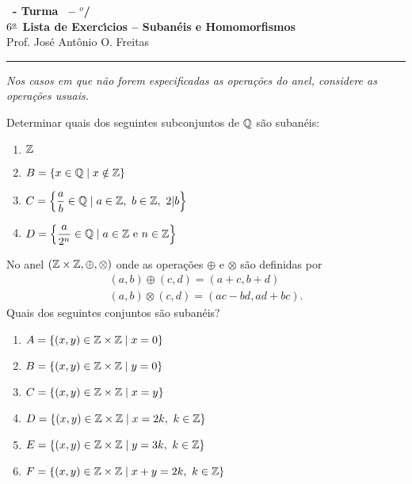 \documentclass[12pt]{exam}
\begin{document}
\begin{center}
{\Large\bf \disciplina\ - Turma \turma\ -- \semestre$^{o}$/\ano} \\ \vspace{9pt} {\large\bf
  $6^{\underline{a}}$ Lista de Exerc{\'\i}cios -- Suban\'eis e Homomorfismos}\\ \vspace{9pt} Prof. Jos{\'e} Ant{\^o}nio O. Freitas
\end{center}
\hrule
\vspace{.6cm}

\textit{Nos casos em que n\~ao forem especificadas as opera\c{c}\~oes do anel, considere as opera\c{c}\~oes usuais.}

\vspace{.6cm}

\questao{} Determinar quais dos seguintes subconjuntos de $\mathbb{Q}$ s{\~a}o suban{\'e}is:
	\begin{multicols}{2}
		\begin{enumerate}[label=({\alph*})]
			\item $\mathbb{Z}$
			\item $B = \{x \in \mathbb{Q} \mid x \notin \mathbb{Z}\}$
			\item $C = \left\{\dfrac{a}{b} \in \mathbb{Q} \mid a \in \mathbb{Z},\ b \in \mathbb{Z},\ 2 |b \right\}$
			\item $D = \left\{\dfrac{a}{2^n} \in \mathbb{Q} \mid a \in \mathbb{Z} \mbox{ e } n \in \mathbb{Z} \right\}$
		\end{enumerate}
	\end{multicols}
 

\vspace{.3cm}

\questao{} No anel $(\mathbb{Z} \times \mathbb{Z}, \oplus, \otimes)$ onde as opera\c{c}\~oes $\oplus$ e $\otimes$ s\~ao definidas por
\begin{align*}
	(a, b) \oplus (c, d) = (a + c, b + d)\\
	(a ,b) \otimes (c, d) = (ac - bd, ad + bc).
\end{align*}
Quais dos seguintes conjuntos s\~ao suban\'eis?
\begin{enumerate}[label=({\alph*})]
	\item $A = \{(x, y) \in \mathbb{Z} \times \mathbb{Z} \mid x = 0\}$
	\item $B = \{(x, y) \in \mathbb{Z} \times \mathbb{Z} \mid y = 0\}$
	\item $C = \{(x, y) \in \mathbb{Z} \times \mathbb{Z} \mid x = y\}$
	\item $D = \{(x, y) \in \mathbb{Z} \times \mathbb{Z} \mid x = 2k,\ k \in \mathbb{Z}\}$
	\item $E = \{(x, y) \in \mathbb{Z} \times \mathbb{Z} \mid y = 3k,\ k \in \mathbb{Z}\}$
	\item $F = \{(x, y) \in \mathbb{Z} \times \mathbb{Z} \mid x + y = 2k,\ k \in \mathbb{Z}\}$
\end{enumerate}
\end{document}
